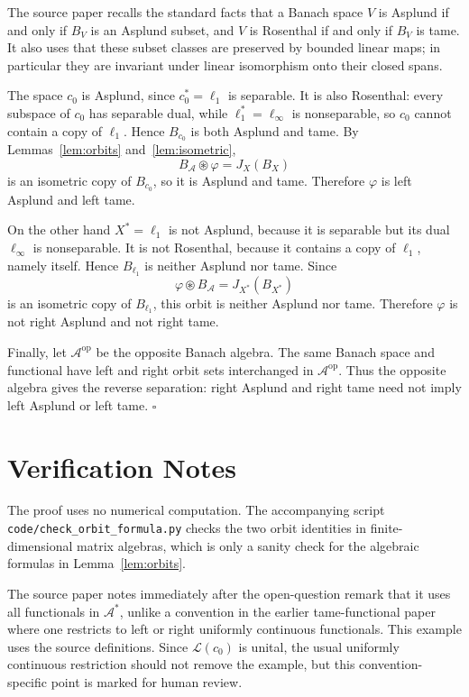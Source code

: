 \documentclass[11pt]{article}
\newcommand{\A}{\mathcal A}
\newcommand{\op}{\operatorname{op}}
\begin{document}
The source paper recalls the standard facts that a Banach space \(V\) is
Asplund if and only if \(B_V\) is an Asplund subset, and \(V\) is Rosenthal
if and only if \(B_V\) is tame.  It also uses that these subset classes are
preserved by bounded linear maps; in particular they are invariant under
linear isomorphism onto their closed spans.

The space \(c_0\) is Asplund, since \(c_0^*=\ell_1\) is separable.  It is also
Rosenthal: every subspace of \(c_0\) has separable dual, while \(\ell_1^*
=\ell_\infty\) is nonseparable, so \(c_0\) cannot contain a copy of
\(\ell_1\).  Hence \(B_{c_0}\) is both Asplund and tame.  By
Lemmas~\ref{lem:orbits} and~\ref{lem:isometric},
\[
   B_\A\circledast\varphi=J_X(B_X)
\]
is an isometric copy of \(B_{c_0}\), so it is Asplund and tame.  Therefore
\(\varphi\) is left Asplund and left tame.

On the other hand \(X^*=\ell_1\) is not Asplund, because it is separable but
its dual \(\ell_\infty\) is nonseparable.  It is not Rosenthal, because it
contains a copy of \(\ell_1\), namely itself.  Hence \(B_{\ell_1}\) is neither
Asplund nor tame.  Since
\[
   \varphi\circledast B_\A=J_{X^*}(B_{X^*})
\]
is an isometric copy of \(B_{\ell_1}\), this orbit is neither Asplund nor
tame.  Therefore \(\varphi\) is not right Asplund and not right tame.

Finally, let \(\A^{\op}\) be the opposite Banach algebra.  The same Banach
space and functional have left and right orbit sets interchanged in
\(\A^{\op}\).  Thus the opposite algebra gives the reverse separation:
right Asplund and right tame need not imply left Asplund or left tame.
\(\square\)

\section*{Verification Notes}

The proof uses no numerical computation.  The accompanying script
\texttt{code/check\_orbit\_formula.py} checks the two orbit identities in
finite-dimensional matrix algebras, which is only a sanity check for the
algebraic formulas in Lemma~\ref{lem:orbits}.

The source paper notes immediately after the open-question remark that it
uses all functionals in \(\A^*\), unlike a convention in the earlier
tame-functional paper where one restricts to left or right uniformly
continuous functionals.  This example uses the source definitions.  Since
\(\mathcal L(c_0)\) is unital, the usual uniformly continuous restriction
should not remove the example, but this convention-specific point is marked
for human review.
\end{document}
